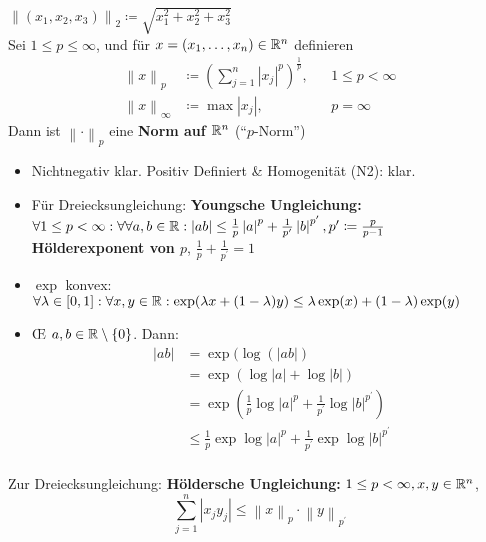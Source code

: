 \begin{subexample}[$ \R^n $, Normen]
	$ \left\| (x_1, x_2, x_3) \right\|_{2}  \coloneqq \sqrt{x_1^2 + x_2^2 + x_3^2}  $\\
	Sei $ 1 \leq p \leq  \infty $, und für $ x = (x_1, \dotsc, x_n) \in \mathbb{R} ^n $ definieren
	\begin{align*}
		\left\| x \right\| _p &\coloneqq \left( \sum_{j=1}^{n} \left| x_j \right| ^p \right)^{\frac{ 1 }{ p } } , && 1 \leq  p < \infty \\
		\left\| x \right\| _\infty & \coloneqq \max \left| x_j \right| , && p = \infty
	\end{align*}
	Dann ist $ \left\| \cdot  \right\| _p  $ eine \textbf{Norm auf $ \R ^n $} (``$ p $-Norm'')
	\begin{itemize}
		\item Nichtnegativ klar. Positiv Definiert \& Homogenität (N2): klar.
		\item Für Dreiecksungleichung: \textbf{Youngsche Ungleichung:} $ \forall 1 \leq p < \infty : \forall \forall a, b \in \mathbb{R} : \left| ab \right| \leq \frac{ 1 }{ p } \left| a \right| ^p + \frac{ 1 }{ p^\prime  } \left| b \right| ^{p^\prime } , p^\prime \coloneqq \frac{ p }{ p - 1 }  $\\
			\textbf{Hölderexponent von $ p $}, $ \frac{ 1 }{ p } + \frac{ 1 }{ p^\prime  } = 1 $
		\item $ \exp  $ konvex: $ \forall \lambda \in [0, 1] : \forall x, y \in \mathbb{R} : \exp (\lambda x + (1 - \lambda) y) \leq \lambda \exp (x) + (1 - \lambda) \exp (y) $ 
		\item \OE{} $ a, b \in \mathbb{R} \setminus \left\{ 0 \right\} $. Dann:
			\begin{align*}
				\left| ab \right| &= \exp ( \log \left( \left| ab \right|  \right)  \\
				~ &= \exp \left( \log \left| a \right| + \log \left| b \right|  \right)  \\
				~ &= \exp \left( \frac{ 1 }{ p } \log \left| a \right| ^p + \frac{ 1 }{ p^\prime  } \log \left| b \right| ^{p^\prime }  \right) \\
				~ &\leq  \frac{ 1 }{ p } \exp \log \left| a \right| ^p + \frac{ 1 }{ p^\prime  } \exp \log \left| b \right| ^{p^\prime }  \\
			\end{align*}
	\end{itemize}
	Zur Dreiecksungleichung: \textbf{Höldersche Ungleichung:} $ 1 \leq p < \infty, x, y \in \mathbb{R} ^n $,
	\[
		\sum_{j=1}^{n} \left| x_j y_j \right| \leq \left\| x \right\| _p \cdot \left\| y \right\| _{p^\prime } 
\]
\end{subexample}
